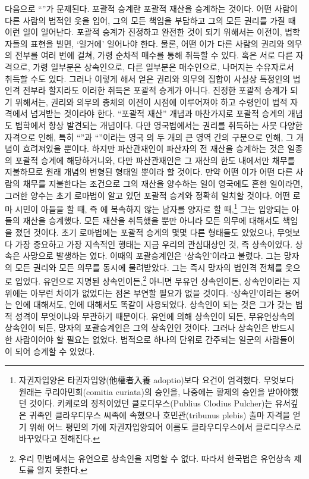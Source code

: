 다음으로 ``''가 문제된다.
포괄적 승계란 포괄적 재산을 승계하는 것이다.
어떤 사람이 다른 사람의 법적인 옷을 입어,
그의 모든 책임을 부담하고 그의 모든 권리를 가질 때 이런 일이 일어난다.
포괄적 승계가 진정하고 완전한 것이 되기 위해서는
이전이,
법학자들의 표현을 빌면, `일거에'
일어나야 한다.
물론, 어떤 이가 다른 사람의 권리와 의무의 전부를 여러 번에 걸쳐,
가령 순차적 매수를 통해 취득할 수 있다.
혹은 서로 다른 자격으로, 가령 일부분은 상속인으로,
다른 일부분은 매수인으로, 나머지는 수유자로서 취득할 수도 있다.
그러나 이렇게 해서 얻은 권리와 의무의 집합이 사실상 특정인의 법인격 전부라
할지라도 이러한 취득은 포괄적 승계가 아니다.
진정한 포괄적 승계가 되기 위해서는,
권리와 의무의 총체의 이전이  시점에 이루어져야 하고
수령인이  법적 자격에서 넘겨받는 것이라야 한다.
``포괄적 재산'' 개념과 마찬가지로 포괄적 승계의 개념도
법학에서 항상 발견되는 개념이다.
다만 영국법에서는 권리를 취득하는 사뭇 다양한 자격으로 인해,
특히 ``''과 ``''이라는
영국 의 두 개의 큰 영역 간의 구분으로 인해, 그 개념이 흐려져있을 뿐이다.
하지만 파산관재인이 파산자의 전 재산을 승계하는 것은
일종의 포괄적 승계에 해당하거니와,
다만
파산관재인은 그 재산의 한도 내에서만 채무를 지불하므로
원래 개념의 변형된 형태일 뿐이라 할 것이다.
만약 어떤 이가 어떤 다른 사람의  채무를 지불한다는 조건으로
그의  재산을 양수하는 일이 영국에도 흔한 일이라면,
그러한 양수는 초기 로마법이 알고 있던 포괄적 승계와 정확히 일치할 것이다.
어떤 로마 시민이 아들을
할 때,
즉 에 복속하지 않는 남자를 양자로 할 때,\footnote{%
  자권자입양은 타권자입양(他權者入養 adoptio)보다 요건이 엄격했다.
  무엇보다 원래는 쿠리아민회(comitia curiata)의 승인을,
  나중에는 황제의 승인을 받아야했던 것이다.
  키케로의 정적이었던 클로디우스(Publius Clodius Pulcher)는
  유서깊은 귀족인 클라우디우스 씨족에 속했으나
  호민관(tribunus plebis) 출마 자격을 얻기 위해
  어느 평민의 가에 자권자입양되어 이름도 클라우디우스에서
  클로디우스로 바꾸었다고 전해진다. }
그는 입양되는 아들의 재산을  승계했다.
모든 재산을 취득했을 뿐만 아니라 모든 의무에 대해서도 책임을 졌던 것이다.
초기 로마법에는 포괄적 승계의 몇몇 다른 형태들도 있었으나,
무엇보다 가장 중요하고 가장 지속적인 행태는 지금 우리의 관심대상인 것,
즉 상속이었다.
상속은 사망으로 발생하는 였다.
이때의 포괄승계인은 `상속인'이라고 불렸다.
그는 망자의 모든 권리와 모든 의무를 동시에 물려받았다.
그는 즉시 망자의 법인격 전체를 옷으로 입었다.
유언으로 지명된 상속인이든,\footnote{%
  우리 민법에서는 유언으로 상속인을 지명할 수 없다. 따라서
  한국법은 유언상속 제도를 알지 못한다.}
아니면
무유언 상속인이든, 상속인이라는 지위에는 아무런 차이가 없었다는 점은
부연할 필요가 없을 것이다.
`상속인'이라는 용어는 인에 대해서도, 인에 대해서도
똑같이 사용되었다.
상속인이 되는 것은 그가 갖는 법적 성격이 무엇이냐와
무관하기 때문이다.
유언에 의해 상속인이 되든, 무유언상속의 상속인이 되든,
망자의 포괄승계인은 그의 상속인인 것이다.
그러나 상속인은 반드시 한 사람이어야 할 필요는 없었다.
법적으로 하나의 단위로 간주되는 일군의 사람들이
이 되어 승계할 수 있었다.


